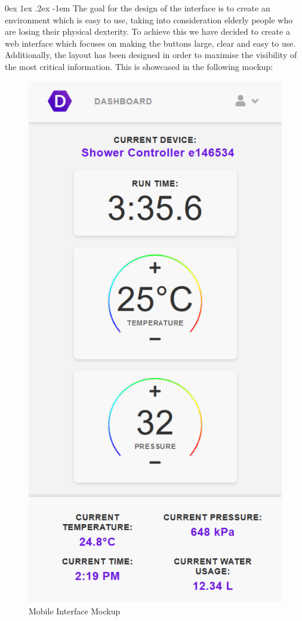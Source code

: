 \documentclass[12pt, a4paper]{article}
\makeatletter
\renewcommand\paragraph{\@startsection{paragraph}{5}{\parindent}%
  {0ex \@plus1ex \@minus.2ex}%
  {-1em}%
  {\normalfont\normalsize\bfseries}}
\makeatother
\begin{document}
                \paragraph{}
                    The goal for the design of the interface is to create an environment which is easy to use, taking into consideration elderly people who 
                    are losing their physical dexterity. To achieve this we have decided to create a web interface which focuses on making the buttons large, 
                    clear and easy to use. Additionally, the layout has been designed in order to maximise the visibility of the most critical information. 
                    This is showcased in the following mockup:
                    \begin{figure}[H]
                        \centering
                        \includegraphics[width=0.5\linewidth]{img/Daedal_Mobile1.png}
                        \caption{Mobile Interface Mockup}
                    \end{figure}
\end{document}
